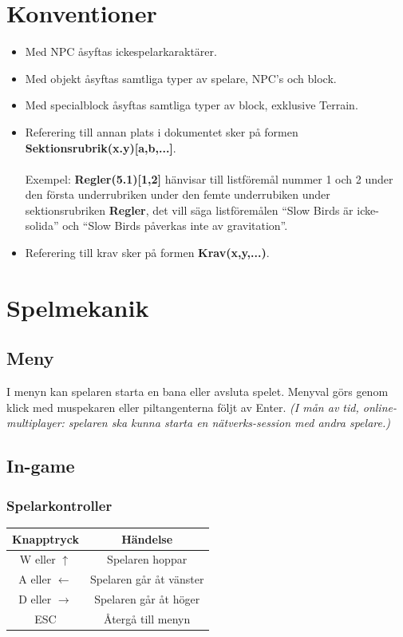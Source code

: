 \documentclass{TDP003mall}
\begin{document}
\section{Konventioner}
\begin{itemize}
\item Med NPC åsyftas ickespelarkaraktärer.
\item Med objekt åsyftas samtliga typer av spelare, NPC's och block.
\item Med specialblock åsyftas samtliga typer av block, exklusive Terrain.
\item Referering till annan plats i dokumentet sker på formen \textbf{Sektionsrubrik(x.y)[a,b,...]}.
\\\\
Exempel: \textbf{Regler(5.1)[1,2]} hänvisar till listföremål nummer 1 och 2 under den första underrubriken under den femte underrubiken under sektionsrubriken \textbf{Regler}, det vill säga listföremålen ``Slow Birds är icke-solida'' och ``Slow Birds påverkas inte av gravitation''.
\item Referering till krav sker på formen \textbf{Krav(x,y,...)}.
\end{itemize}

\newpage

\section{Spelmekanik}
\subsection{Meny}
I menyn kan spelaren starta en bana eller avsluta spelet. Menyval görs genom klick med muspekaren eller piltangenterna följt av Enter. \textit{(I mån av tid, online-multiplayer: spelaren ska kunna starta en nätverks-session med andra spelare.)}

\subsection{In-game}

\subsubsection{Spelarkontroller}
\begin{tabular}{|c|c|}
\hline
\textbf{Knapptryck} & \textbf{Händelse} \\\hline
W eller $\uparrow$ & Spelaren hoppar \\\hline
A eller $\leftarrow$ & Spelaren går åt vänster \\\hline
D eller $\rightarrow$ & Spelaren går åt höger \\\hline
ESC & Återgå till menyn \\\hline
\end{tabular}
\end{document}

